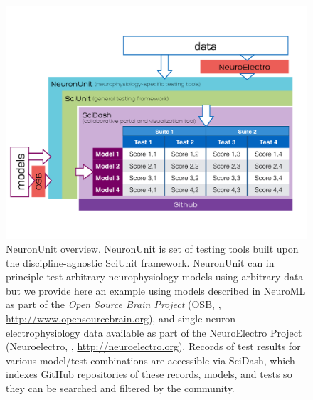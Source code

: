 \documentclass[9pt]{sig-alternate}
\begin{document}
\begin{figure}[t]
\centering
\includegraphics[scale=0.4]{diagram1.pdf}
\vspace{-25px}
\caption{NeuronUnit overview. NeuronUnit is set of testing tools built upon the discipline-agnostic SciUnit framework. 
NeuronUnit can in principle test arbitrary neurophysiology models using arbitrary data but we provide here an example using models described in NeuroML as part of the \textit{Open Source Brain Project} (OSB, \cite{gleeson_open_2012}, \url{http://www.opensourcebrain.org}), and single neuron electrophysiology data available as part of the NeuroElectro Project (Neuroelectro, \cite{tripathy_neuroelectro:_2012}, \url{http://neuroelectro.org}).  
Records of test results for various model/test combinations are accessible via SciDash, which indexes GitHub repositories of these records, models, and tests so they can be searched and filtered by the community.}  
\label{fig:sciunit_overview}
\end{figure}
\leavevmode
\vspace{-0px}
\end{document}
